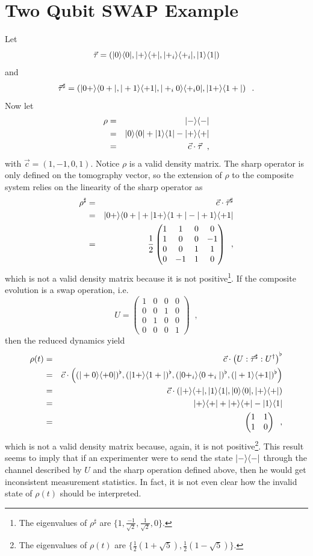\section{Two Qubit SWAP Example}
Let
$$
\vec{\tau}=\left(|0\rangle\langle0|,|+\rangle\langle+|,|+_i\rangle\langle+_i|,|1\rangle\langle1|\right)
$$
and
$$
\vec{\tau}^\sharp = \left(|0+\rangle\langle0+|,|+1\rangle\langle+1|,|+_i0\rangle\langle+_i0|,|1+\rangle\langle1+|\right)\;\;.
$$
Now let
\begin{eqnarray*}
\rho &=& |-\rangle\langle-| \\
&=& |0\rangle\langle0|+|1\rangle\langle1|-|+\rangle\langle+|\\
&=& \vec{c}\cdot\vec{\tau}\;\;,
\end{eqnarray*}
with $\vec{c}=(1,-1,0,1)$.  Notice $\rho$ is a valid density matrix.  The sharp operator is only defined on the tomography vector, so the extension of $\rho$ to the composite system relies on the linearity of the sharp operator as
\begin{eqnarray*}
\rho^\sharp &=& \vec{c}\cdot\vec{\tau}^\sharp\\
&=& |0+\rangle\langle0+| + |1+\rangle\langle1+| - |+1\rangle\langle+1|\\
&=& \frac{1}{2}\begin{pmatrix}
1&1&0&0\\
1&0&0&-1\\
0&0&1&1\\
0&-1&1&0
\end{pmatrix}\;\;,
\end{eqnarray*}
which is not a valid density matrix because it is not positive\footnote{The eigenvalues of $\rho^\sharp$ are $\{1,\frac{-1}{\sqrt{2}},\frac{1}{\sqrt{2}},0\}$.}.  If the composite evolution is a swap operation, i.e.\
$$
U = \begin{pmatrix}
1&0&0&0\\
0&0&1&0\\
0&1&0&0\\
0&0&0&1
\end{pmatrix}\;\;,
$$
then the reduced dynamics yield
\begin{eqnarray*}
\rho(t) &=& \vec{c}\cdot\left(U:\vec{\tau}^\sharp:U^\dagger\right)^\flat\\
&=& \vec{c}\cdot\left((|+0\rangle\langle+0|)^\flat,(|1+\rangle\langle1+|)^\flat,(|0+_i\rangle\langle0+_i|)^\flat,(|+1\rangle\langle+1|)^\flat\right)\\
&=& \vec{c}\cdot\left(|+\rangle\langle+|,|1\rangle\langle1|,|0\rangle\langle0|,|+\rangle\langle+|\right)\\
&=& |+\rangle\langle+| + |+\rangle\langle+| -|1\rangle\langle1|\\
&=& \begin{pmatrix}
1&1\\
1&0
\end{pmatrix}\;\;,
\end{eqnarray*}
which is not a valid density matrix because, again, it is not positive\footnote{The eigenvalues of $\rho(t)$ are $\{\frac{1}{2}\left(1+\sqrt{5}\right),\frac{1}{2}\left(1-\sqrt{5}\right)\}$.}.  This result seems to imply that if an experimenter were to send the state $|-\rangle\langle-|$ through the channel described by $U$ and the sharp operation defined above, then he would get inconsistent measurement statistics.  In fact, it is not even clear how the invalid state of $\rho(t)$ should be interpreted.

